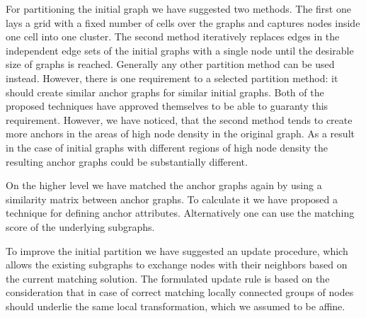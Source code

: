 For partitioning the initial graph we have suggested two methods. The first one lays a grid with a fixed number of cells over the graphs and captures nodes inside one cell into one cluster. The second method iteratively replaces edges in the independent edge sets of the initial graphs with a single node until the desirable size of graphs is reached. Generally any other partition method can be used instead. However, there is one requirement to a selected partition method: it should create similar anchor graphs for similar initial graphs. Both of the proposed techniques have approved themselves to be able to guaranty this requirement. However, we have noticed, that the second method tends to create more anchors in the areas of high node density in the original graph. As a result in the case of initial graphs with different regions of high node density the resulting anchor graphs could be substantially different.

On the higher level we have matched the anchor graphs again by using a similarity matrix between anchor graphs. To calculate it we have proposed a technique for defining anchor attributes. Alternatively one can use the matching score of the underlying subgraphs. 

To improve the initial partition we have suggested an update procedure, which allows the existing subgraphs to exchange nodes with their neighbors based on the current matching solution. The formulated update rule is based on the consideration that in case of correct matching locally connected groups of nodes should underlie the same local transformation, which we assumed to be affine.

